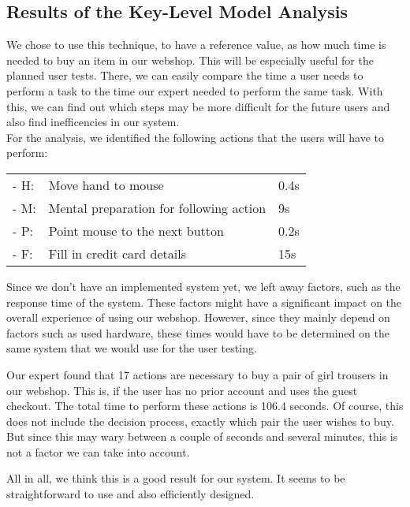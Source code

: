 \subsection{Results of the Key-Level Model Analysis}
We chose to use this technique, to have a reference value, as how much time is needed to buy an item in our webshop. This will be especially useful for the planned user tests. There, we can easily compare the time a user needs to perform a task to the time our expert needed to perform the same task. With this, we can find out which steps may be more difficult for the future users and also find inefficencies in our system.\\
For the analysis, we identified the following actions that the users will have to perform:\\
\begin{tabular}{l l l}
	\hspace{0.5cm}- H: & Move hand to mouse & 0.4s\\
	\hspace{0.5cm}- M: & Mental preparation for following action & 9s\\
	\hspace{0.5cm}- P: & Point mouse to the next button & 0.2s\\
	\hspace{0.5cm}- F: & Fill in credit card details & 15s\\
\end{tabular}

Since we don't have an implemented system yet, we left away factors, such as the response time of the system. These factors might have a significant impact on the overall experience of using our webshop. However, since they mainly depend on factors such as used hardware, these times would have to be determined on the same system that we would use for the user testing.

Our expert found that 17 actions are necessary to buy a pair of girl trousers in our webshop. This is, if the user has no prior account and uses the guest checkout. The total time to perform these actions is 106.4 seconds. Of course, this does not include the decision process, exactly which pair the user wishes to buy. But since this may wary between a couple of seconds and several minutes, this is not a factor we can take into account.

All in all, we think this is a good result for our system. It seems to be straightforward to use and also efficiently designed.